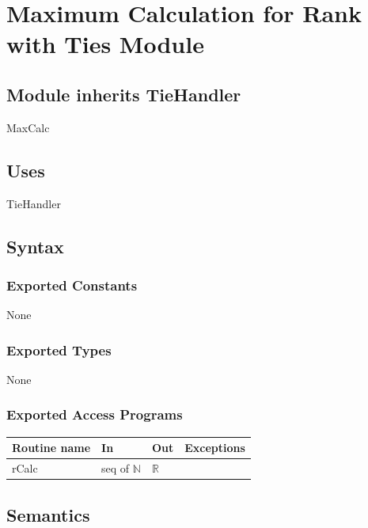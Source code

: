 \documentclass[12pt,fleqn]{examtst}
\begin{document}

\newpage

\section* {Maximum Calculation for Rank with Ties Module}

\subsection*{Module inherits TieHandler}

MaxCalc

\subsection* {Uses}

TieHandler

\subsection* {Syntax}

\subsubsection* {Exported Constants}

None

\subsubsection* {Exported Types}

None

\subsubsection* {Exported Access Programs}

\begin{tabular}{| l | l | l | p{5cm} |}
\hline
\textbf{Routine name} & \textbf{In} & \textbf{Out} & \textbf{Exceptions}\\
\hline
rCalc & seq of $\mathbb{N}$ & $\mathbb{R}$ & ~\\
\hline
\end{tabular}

\subsection* {Semantics}
\end{document}

